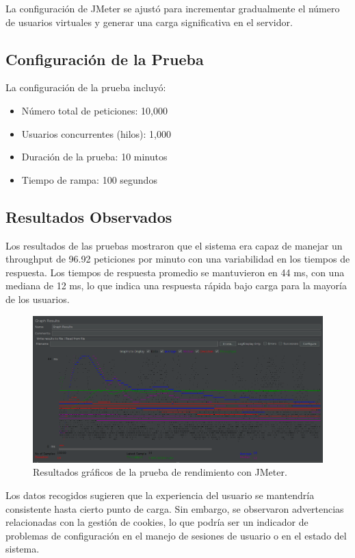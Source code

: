 La configuración de JMeter se ajustó para incrementar gradualmente el número de usuarios virtuales y generar una carga significativa en el servidor.

\subsection{Configuración de la Prueba}

La configuración de la prueba incluyó:

\begin{itemize}
    \item Número total de peticiones: 10,000
    \item Usuarios concurrentes (hilos): 1,000
    \item Duración de la prueba: 10 minutos
    \item Tiempo de rampa: 100 segundos
\end{itemize}

\subsection{Resultados Observados}

Los resultados de las pruebas mostraron que el sistema era capaz de manejar un throughput de 96.92 peticiones por minuto con una variabilidad en los tiempos de respuesta. Los tiempos de respuesta promedio se mantuvieron en 44 ms, con una mediana de 12 ms, lo que indica una respuesta rápida bajo carga para la mayoría de los usuarios.

\begin{figure}[H]
\centering
\includegraphics[width=\textwidth]{imagenes/graforendimiento.png}
\caption{Resultados gráficos de la prueba de rendimiento con JMeter.}
\label{fig:grafico-jmeter}
\end{figure}

Los datos recogidos sugieren que la experiencia del usuario se mantendría consistente hasta cierto punto de carga. Sin embargo, se observaron advertencias relacionadas con la gestión de cookies, lo que podría ser un indicador de problemas de configuración en el manejo de sesiones de usuario o en el estado del sistema.

